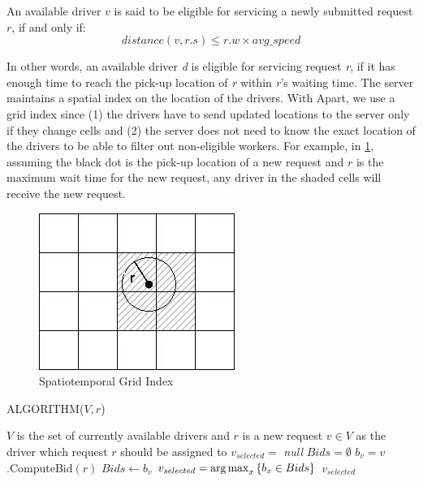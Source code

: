 \begin{definition} 
An available driver $v$ is said to be eligible for servicing a newly submitted request $r$, if and only if:
\begin{equation*}
distance(v, r.s) \leq r.w \times avg\_speed
\end{equation*}
\end{definition}

\noindent In other words, an available driver \textit{d} is eligible for servicing request \textit{r}, if it has enough time to reach the pick-up location of \textit{r} within \textit{r}'s waiting time. The server maintains a spatial index on the location of the drivers. With Apart, we use a grid index since (1) the drivers have to send updated locations to the server only if they change cells and (2) the server does not need to know the exact location of the drivers to be able to filter out non-eligible workers. For example, in \cref{fig:grid_index}, assuming the black dot is the pick-up location of a new request and $r$ is the maximum wait time for the new request, any driver in the shaded cells will receive the new request.

\begin{figure}[!ht]
	\centering
	\includegraphics[width=0.45\columnwidth]{fig/grid_index.jpg}
	\vspace{-0mm}\caption{Spatiotemporal Grid Index} \vspace{-2mm} \label{fig:grid_index}
\end{figure}\vspace{-0mm}

\begin{algorithm}
\caption{ALGORITHM($V, r$)}
\label{algo:ALGORITHM}
\begin{algorithmic}[1]
\REQUIRE $V$ is the set of currently available drivers and $r$ is a new request
\ENSURE $v \in V$ as the driver which request $r$ should be assigned to
\STATE $v_{selected} = $ \emph{null}
\STATE $Bids = \emptyset$
 \label{line:loop_start}
	\STATE $b_v = v$.ComputeBid$(r)$ \label{line:compute}
	\STATE $Bids \leftarrow  b_v$
\ENDFOR \label{line:loop_end}
\STATE $v_{selected} = \operatorname*{arg\,max}_x \left\lbrace b_x \in Bids \right\rbrace$ \label{line:select}
\RETURN $v_{selected}$
\end{algorithmic}
\end{algorithm}

